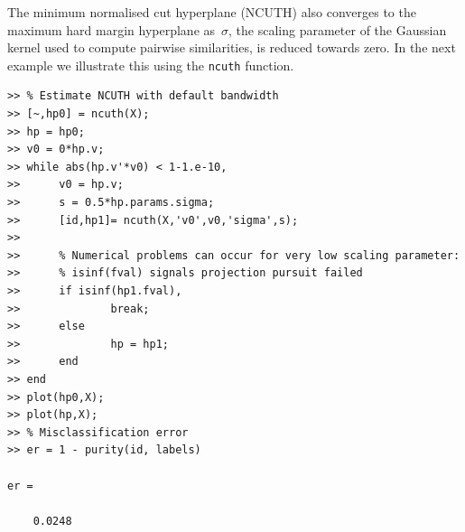 \documentclass{book}
\begin{document}
The minimum normalised cut hyperplane (NCUTH) also converges to the maximum
hard margin hyperplane as~$\sigma$, the scaling parameter of the Gaussian
kernel used to compute pairwise similarities, is reduced towards zero. In the
next example we illustrate this using the {\tt ncuth} function.


\begin{lstlisting}
>> % Estimate NCUTH with default bandwidth
>> [~,hp0] = ncuth(X);
>> hp = hp0;
>> v0 = 0*hp.v;
>> while abs(hp.v'*v0) < 1-1.e-10,
>>      v0 = hp.v;
>>      s = 0.5*hp.params.sigma;
>>      [id,hp1]= ncuth(X,'v0',v0,'sigma',s);
>>	
>>      % Numerical problems can occur for very low scaling parameter:
>>      % isinf(fval) signals projection pursuit failed 
>>      if isinf(hp1.fval),
>>              break;
>>      else
>>              hp = hp1;
>>      end
>> end
>> plot(hp0,X);
>> plot(hp,X);
>> % Misclassification error
>> er = 1 - purity(id, labels)

er =

    0.0248

\end{lstlisting}
\end{document}
